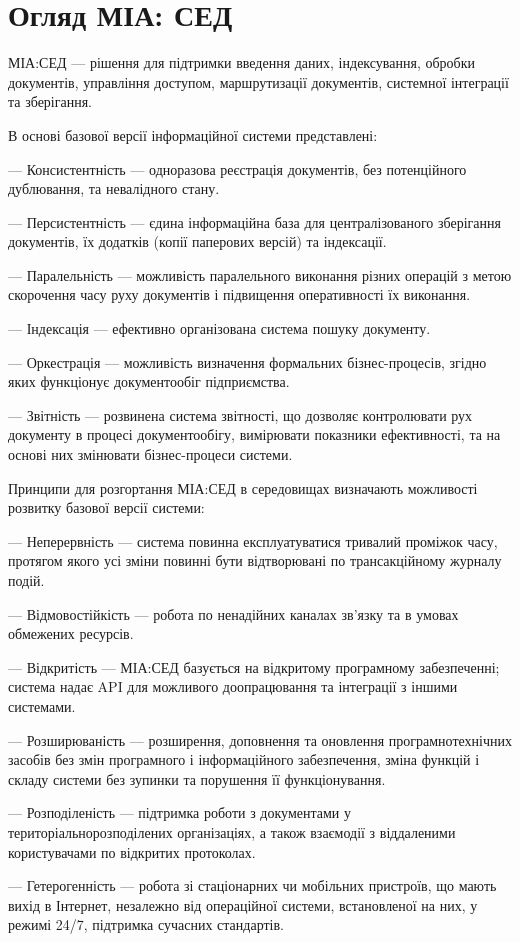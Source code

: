 \chapter{Огляд МІА: СЕД}

МІА:СЕД --- рішення для підтримки введення даних, індексування, обробки
документів, управління доступом, маршрутизації документів, системної
інтеграції та зберігання.

В основі базової версії інформаційної системи представлені:

--- Консистентність --- одноразова реєстрація документів, без потенційного
дублювання, та невалідного стану.

--- Персистентність --- єдина інформаційна база для централізованого зберігання
документів, їх додатків (копії паперових версій) та індексації.

--- Паралельність — можливість паралельного виконання різних операцій з
метою скорочення часу руху документів і підвищення оперативності їх
виконання.

--- Індексація --- ефективно організована система пошуку документу.

--- Оркестрація --- можливість визначення формальних бізнес-процесів, згідно
яких функціонує документообіг підприємства.

--- Звітність --- розвинена система звітності, що дозволяє контролювати рух
документу в процесі документообігу, вимірювати показники ефективності,
та на основі них змінювати бізнес-процеси системи.

Принципи для розгортання МІА:СЕД в середовищах визначають
можливості розвитку базової версії системи:

--- Неперервність --- система повинна експлуатуватися тривалий проміжок часу,
протягом якого усі зміни повинні бути відтворювані по трансакційному
журналу подій.

--- Відмовостійкість --- робота по ненадійних каналах зв’язку та в умовах
обмежених ресурсів.

--- Відкритість --- МІА:СЕД базується на відкритому програмному забезпеченні;
система надає API для можливого доопрацювання та інтеграції з іншими
системами.

--- Розширюваність --- розширення, доповнення та оновлення програмнотехнічних засобів без змін програмного і інформаційного забезпечення,
зміна функцій і складу системи без зупинки та порушення її
функціонування.

--- Розподіленість --- підтримка роботи з документами у територіальнорозподілених організаціях, а також взаємодії з віддаленими користувачами
по відкритих протоколах.

--- Гетерогенність --- робота зі стаціонарних чи мобільних пристроїв, що мають
вихід в Інтернет, незалежно від операційної системи, встановленої на них, у
режимі 24/7, підтримка сучасних стандартів.

